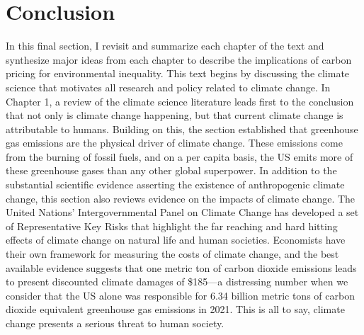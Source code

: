 \newpage
\section*{Conclusion}

In this final section, I revisit and summarize each chapter of the text and synthesize major ideas from each chapter to describe the implications of carbon pricing for environmental inequality. This text begins by discussing the climate science that motivates all research and policy related to climate change. In Chapter 1, a review of the climate science literature leads first to the conclusion that not only is climate change happening, but that current climate change is attributable to humans. Building on this, the section established that greenhouse gas emissions are the physical driver of climate change. These emissions come from the burning of fossil fuels, and on a per capita basis, the US emits more of these greenhouse gases than any other global superpower. In addition to the substantial scientific evidence asserting the existence of anthropogenic climate change, this section also reviews evidence on the impacts of climate change. The United Nations' Intergovernmental Panel on Climate Change has developed a set of Representative Key Risks that highlight the far reaching and hard hitting effects of climate change on natural life and human societies. Economists have their own framework for measuring the costs of climate change, and the best available evidence suggests that one metric ton of carbon dioxide emissions leads to present discounted climate damages of \$185---a distressing number when we consider that the US alone was responsible for 6.34 billion metric tons of carbon dioxide equivalent greenhouse gas emissions in 2021. This is all to say, climate change presents a serious threat to human society.

